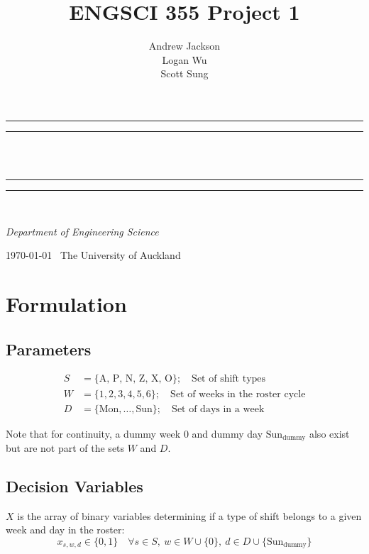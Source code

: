 \documentclass[a4paper]{article}
\title{ENGSCI 355 Project 1}
\author{Andrew Jackson\\Logan Wu\\Scott Sung}
\newlength{\drop}
\begin{document}
\begin{titlepage}
    \textheight
    \centering
    \vspace*{\baselineskip}
    \rule{\textwidth}{1.6pt}\vspace*{-\baselineskip}\vspace*{2pt}
    \rule{\textwidth}{0.4pt}\\[\baselineskip]
    {\LARGE \@title}\\[0.2\baselineskip]
    \rule{\textwidth}{0.4pt}\vspace*{-\baselineskip}\vspace{3.2pt}
    \rule{\textwidth}{1.6pt}\\[\baselineskip]
    \vspace*{2\baselineskip}
    {\Large \textsc{\@author}\par}
    {\itshape Department of Engineering Science\par}
    \vspace*{2\baselineskip}
    {\scshape \today} \        {\large The University of Auckland}\par
\end{titlepage}
\makeatother
\pagestyle{fancy}

\section{Formulation}

\subsection{Parameters}

\begin{align*}
S &= \{\text{A, P, N, Z, X, O}\}; \quad\text{Set of shift types}\\
W &= \{1, 2, 3, 4, 5, 6\}; \quad\text{Set of weeks in the roster cycle}\\
D &= \{\text{Mon},\dots,\text{Sun}\}; \quad\text{Set of days in a week}
\end{align*}

Note that for continuity, a dummy week $0$ and dummy day $\text{Sun}_\text{dummy}$ also exist but are not part of the sets $W$ and $D$.

\subsection{Decision Variables}

$X$ is the array of binary variables determining if a type of shift belongs to a given week and day in the roster:
$$x_{s, w, d} \in \{0, 1\} \quad\forall s\in S,\  w\in W \cup \{0\},\  d\in D \cup \{\text{Sun}_\text{dummy}\}$$
\end{document}
